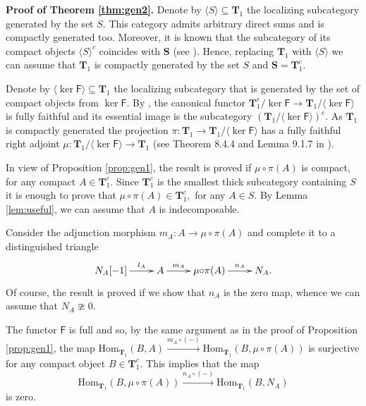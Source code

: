 \documentclass[a4paper,11pt,twoside]{amsart}
\numberwithin{equation}{section}
\theoremstyle{definition}
\begin{document}
\medskip

\noindent
{\bf Proof of Theorem \ref{thm:gen2}.}
Denote by $\langle S\rangle\subseteq{{\mathbf{{T}}}}_1$ the localizing subcategory
generated by the set $S.$ This category admits arbitrary direct sums
and is compactly generated too.
Moreover, it is known that the subcategory of its compact objects $\langle S\rangle^c$ coincides with ${{\mathbf{{S}}}}$ (see \cite[Lemma 2.2]{N1}).
Hence, replacing ${{\mathbf{{T}}}}_1$ with $\langle S\rangle$ we can assume that ${{\mathbf{{T}}}}_1$ is compactly generated by the set $S$ and
 ${{\mathbf{{S}}}}={{\mathbf{{T}}}}_1^c.$

Denote by $\langle \ker{\mathsf{{F}}}\rangle \subseteq{{\mathbf{{T}}}}_1$ the localizing subcategory that
is generated by the set of compact objects from $\ker{\mathsf{{F}}}.$ By
\cite[Thm.\ 2.1]{N1}, the canonical functor
${{\mathbf{{T}}}}_1^c/\ker{\mathsf{{F}}}\to{{\mathbf{{T}}}}_1/\langle \ker{\mathsf{{F}}}\rangle$ is fully faithful and
its essential image is the subcategory $({{\mathbf{{T}}}}_1/\langle \ker{\mathsf{{F}}}\rangle)^c.$ As
${{\mathbf{{T}}}}_1$ is compactly generated the projection
$\pi\colon{{\mathbf{{T}}}}_1\to{{\mathbf{{T}}}}_1/\langle \ker{\mathsf{{F}}}\rangle$ has a fully faithful right
adjoint $\mu\colon{{\mathbf{{T}}}}_1/\langle \ker{\mathsf{{F}}}\rangle\to{{\mathbf{{T}}}}_1$ (see Theorem 8.4.4
and Lemma 9.1.7 in \cite{N2}).

In view of Proposition \ref{prop:gen1}, the result is proved if
$\mu{\circ}\pi(A)$ is compact, for any compact $A\in{{\mathbf{{T}}}}_1^c.$ Since
${{\mathbf{{T}}}}_1^c$ is the smallest thick subcategory containing $S$ it is enough
to prove that $\mu{\circ}\pi(A)\in{{\mathbf{{T}}}}_1^c,$ for any
$A\in S.$ By Lemma \ref{lem:useful}, we can assume that $A$ is indecomposable.

Consider the adjunction morphism $m_A\colon A\to\mu{\circ}\pi(A)$ and
complete it to a distinguished triangle
\begin{equation}\label{trian}
\xymatrix{
{{N_A}[-1]}\ar[r]^-{l_A}&A\ar[r]^-{m_A}&\mu{\circ}\pi(A)\ar[r]^-{n_A}&N_A.
}
\end{equation}
Of course, the result is proved if we show that $n_A$ is the zero
map, whence we can assume that $N_A{\ncong}0.$

The functor ${\mathsf{{F}}}$ is full and so, by the same argument as in the proof of Proposition \ref{prop:gen1}, the map
${\mathrm{Hom}}_{{{\mathbf{{T}}}}_1}(B,A){\xrightarrow{{m_A{\circ}(-)}}}{\mathrm{Hom}}_{{{\mathbf{{T}}}}_1}(B,\mu{\circ}\pi(A))$
is surjective for any compact object $B\in{{\mathbf{{T}}}}_1^c.$ This implies that
the map
\begin{equation}\label{eqn:us1}
{\mathrm{Hom}}_{{{\mathbf{{T}}}}_1}(B,\mu{\circ}\pi(A)){\xrightarrow{{n_A{\circ}(-)}}}{\mathrm{Hom}}_{{{\mathbf{{T}}}}_1}(B,N_A)
\end{equation}
is zero.
\end{document}
